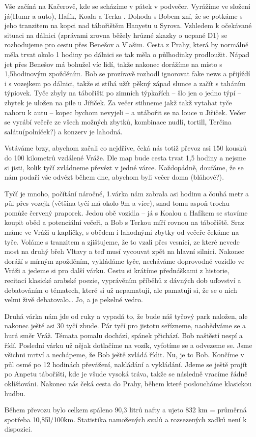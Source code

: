 Vše začíná na Kačerově, kde se scházíme v pátek v podvečer. Vyrážíme ve složení já(Humr a auto), Hafík, Koala a Terka . Dohoda s Bobem zní, že se potkáme s jeho tranzitem na kopci nad tábořištěm Hanyetu u Syrova. Vzhledem k očekávané situaci na dálnici (zprávami zrovna běžely hrůzné zkazky o ucpané D1) se rozhodujeme pro cestu přes Benešov a Vlašim. Cesta z Prahy, která by normálně měla trvat okolo 1 hodiny po dálnici se tak měla o půlhodinky prodloužit. Nápad jet přes Benešov má bohužel víc lidí, takže nakonec dorážíme na místo s 1,5hodinovým zpožděním. Bob se prozíravě rozhodl ignorovat fake news a přijíždí i s vozejkem po dálnici, takže si stíhá užít pěkný západ slunce a začít s taháním týpiovek. Tyče zbyly na tábořišti po zimních týpkařích – šlo jen o jedno týpí – zbytek je uložen na pile u Jiřiček. Za večer stihneme jakž takž vytahat tyče nahoru k autu – kopec bychom nevyjeli – a utábořit se na louce u Jiřiček. Večer se vyrábí večeře ze všech možných zbytků, kombinace nudlí, tortill, Terčina salátu(polníček?) a konzerv je lahodná.

Vstáváme brzy, abychom začali co nejdříve, čeká nás totiž převoz asi 150 kousků do 100 kilometrů vzdálené Vráže. Dle map bude cesta trvat 1,5 hodiny a nejsme si jisti, kolik tyčí zvládneme převézt v jedné várce. Každopádně, doufáme, že se nám podaří vše odvézt během dne, abychom byli večer doma (bláhové?).

Tyčí je mnoho, počítání náročné, 1.várka nám zabrala asi hodinu a čouhá metr a půl přes vozejk (většina tyčí má okolo 9m a více), snad tomu aspoň trochu pomůže červený praporek. Jedou obě vozidla – já s Koalou a Hafíkem se stavíme koupit oběd a potenciální večeři, a Bob s Terkou míří rovnou na tábořiště. Sraz máme ve Vráži u kapličky, s obědem i lahodnými zbytky od večeře čekáme na tyče. Voláme s tranzitem a zjišťujeme, že to vzali přes vesnici, ze které nevede most na druhý břeh Vltavy a teď musí vycouvat zpět na hlavní silnici. Nakonec doráží s mírným zpožděním, vykládáme tyče, necháváme doprovodné vozidlo ve Vráži a jedeme si pro další várku. Cestu si krátíme přednáškami z historie, recitací klasické arabské poezie, vyprávěním příběhů z dávných dob uďovství a debatováním o tématech, které si už nepamatuji, ale pamatuji si, že se o nich velmi živě debatovalo… Jo, a je pekelné vedro. 

Druhá várka nám jde od ruky a vypadá to, že bude náš tyčový park naložen, ale nakonec ještě asi 30 tyčí zbude. Pár tyčí pro jistotu seřízneme, naobědváme se a hurá směr Vráž. Témata pomalu dochází, spánek přichází. Bob naštěstí nespí a řídí. Poslední várku už nějak dotlačíme na vozík, vyfotíme se a odvezeme se. Jsme všichni mrtví a nechápeme, že Bob ještě zvládá řídit. Nu, je to Bob. Končíme v půl osmé po 12 hodinách převážení, nakládání a vykládání. Jdeme se ještě projít po Anpetu tábořišti, kde je všude vysoká tráva, takže se následně vracíme řádně oklíšťováni.
Nakonec nás čeká cesta do Prahy, během které posloucháme klasickou hudbu. 

Během převozu bylo celkem spáleno 90,3 litrů nafty a ujeto 832 km = průměrná spotřeba 10,85l/100km. Statistika namožených svalů a rozsezených zadků není k dispozici.

